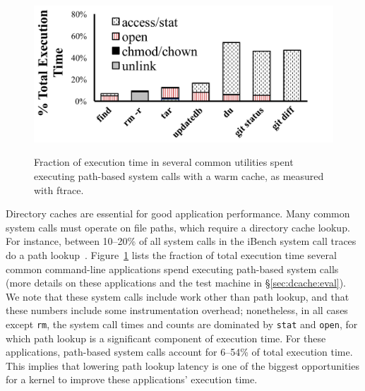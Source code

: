 


\begin{figure}[t]
\scriptsize
\centering
\includegraphics[width=4.5in]{dcache/plots/syscall-percentage.pdf} \\
\caption[Fraction of execution time spent executing path-based system calls.]
{Fraction of execution time in several common utilities spent
executing path-based system calls with a warm cache, as measured with ftrace.}
\label{fig:dcache:lookup-frac}
\end{figure}


Directory caches are essential for good application performance.
Many common system calls must operate on file paths,
which require a directory cache lookup.
For instance, between 10--20\% of all system calls in the iBench system call traces do a path lookup~\citep{filenotafile}. 
Figure~\ref{fig:dcache:lookup-frac} lists the fraction of total execution time
several common command-line applications spend executing path-based system calls
(more details on these applications and the test machine in \S\ref{sec:dcache:eval}).
We note that these system calls include work other than path lookup,
and that these numbers include some instrumentation overhead;
nonetheless, in all cases except {\tt rm},
the system call times and counts are dominated by
{\tt stat} and {\tt open}, for which 
path lookup is a significant component of execution time.
For these applications, path-based system calls account for 6--54\% of total execution time.
This implies that
lowering path lookup latency is
 one of the  biggest 
opportunities for a kernel to improve these applications' execution time.




